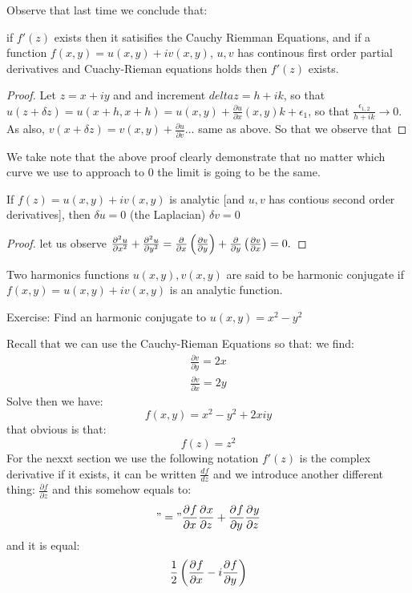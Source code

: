 Observe that last time we conclude that:
\begin{thm}
	if $ f'(z) $ exists then it satisifies the Cauchy Riemman Equations, and if a function $ f(x,y) = u(x,y) + iv(x,y) $, $u,v$ has continous first order partial derivatives and Cuachy-Rieman equations holds then $f'(z)$ exists. 
\end{thm}

\begin{proof}
	Let $z = x + iy$ and and increment $ delta z = h +ik$, so that $ u (z + \delta z) = u (x + h , x+ h) = u(x,y) + \frac{\partial u}{\partial x} (x,y)k + \epsilon_1$, so that $ \frac{\epsilon_{1,2}}{h+ik} \rightarrow 0 $. As also, $ v(x+ \delta z) = v(x,y) + \frac{\partial u}{\partial v}...$ same as above. 
	So that we observe that
\end{proof}
We take note that the above proof clearly demonstrate that no matter which curve we use to approach to $0$ the limit is going to be the same.
\begin{thm}
	If $f(z) = u(x,y) + i v(x,y) $ is analytic [and $u,v$ has contious second order derivatives], then $ \delta u = 0 $ (the Laplacian) $ \delta v = 0 $
\end{thm} 
\begin{proof}
	let us observe $ \frac{ \partial^2 u}{\partial x^2} + \frac{ \partial^2 u}{\partial y^2} = \frac{\partial}{\partial x} \left(  \frac{\partial v}{\partial y} \right)  + \frac{\partial }{\partial y} \left(  \frac{\partial v}{\partial x} \right) = 0. $
\end{proof}

\begin{define}
	Two harmonics functions $ u(x,y), v(x,y) $ are said to be harmonic conjugate if $ f(x,y) = u(x,y) + iv(x,y) $ is an analytic function.
\end{define}

Exercise: Find an harmonic conjugate to $u(x,y) = x^2 - y^2$

Recall that we can use the Cauchy-Rieman Equations so that:
we find:
\begin{align*}
\frac{\partial v}{\partial y} = 2x \\
\frac{\partial v}{\partial x} = 2y
\end{align*}
Solve then we have:
\[ f(x,y) = x^2 - y^2 + 2xiy \]
that obvious is that:
\[ f(z) = z^2  \]
For the nexxt section we use the following notation $ f'(z) $ is the complex derivative if it exists, it can be written $ \frac{df}{dz} $ and we introduce another different thing: $ \frac{\partial f}{\partial z} $ and this somehow equals to:
\[ "=" \frac{\partial^{ } f}{\partial x^{ }} \frac{\partial^{ } x}{\partial z^{ }} + \frac{\partial^{ } f}{\partial y^{ }} \frac{\partial^{ } y}{\partial z^{ }} \]
and it is equal:
\[ \frac{1}{2}\left( \frac{\partial^{} f}{\partial x^{}} - i \frac{\partial^{} f}{\partial y^{}} \right) \]

